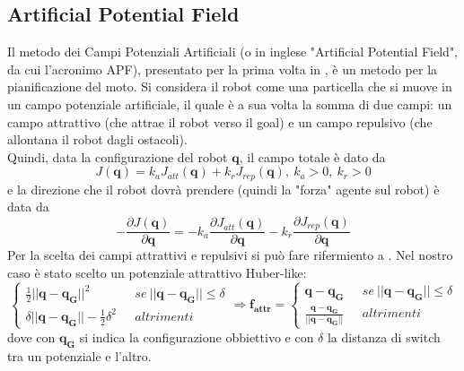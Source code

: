  \subsection{Artificial Potential Field} \label{APF}
Il metodo dei Campi Potenziali Artificiali (o in inglese "Artificial Potential Field", da cui l'acronimo APF), presentato per la prima volta in \cite{khatibAPF}, è un 
metodo per la pianificazione del moto. Si considera il robot come una particella che si muove in un campo potenziale artificiale, il quale è a sua volta la somma di due 
campi: un campo attrattivo (che attrae il robot verso il goal) e un campo repulsivo (che allontana il robot dagli ostacoli). \\
Quindi, data la configurazione del robot $\boldsymbol{q}$, il campo totale è dato da 
\begin{equation}
  J(\boldsymbol{q}) = k_a J_{att}(\boldsymbol{q}) + k_r J_{rep}(\boldsymbol{q}), \: k_a > 0, \: k_r > 0
\end{equation}
e la direzione che il robot dovrà prendere (quindi la "forza" agente sul robot) è data da 
\begin{equation}
  -\frac{\partial  J(\boldsymbol{q})}{\partial \boldsymbol{q}} = -  k_a \frac{\partial  J_{att}(\boldsymbol{q})}{\partial \boldsymbol{q}} - k_r \frac{\partial  J_{rep}(\boldsymbol{q})}{\partial \boldsymbol{q}}
\end{equation}
Per la scelta dei campi attrattivi e repulsivi si può fare rifermiento a \cite{libroRobotica}. Nel nostro caso è stato scelto un potenziale attrattivo Huber-like: 
\begin{equation}
  \begin{cases}
    \frac{1}{2} || \boldsymbol{q} - \boldsymbol{q_G}||^2 \: \: \:  \: \: \: & se \: || \boldsymbol{q} - \boldsymbol{q_G}|| \leq \delta \\
    \delta || \boldsymbol{q} - \boldsymbol{q_G}|| - \frac{1}{2}\delta^2 \: \: \: & altrimenti
  \end{cases} 
  \Rightarrow \boldsymbol{f_{attr}} = 
  \begin{cases}
   \boldsymbol{q} - \boldsymbol{q_G}\: \: \:  & se \: || \boldsymbol{q} - \boldsymbol{q_G}|| \leq \delta \\
    \frac{ \boldsymbol{q} - \boldsymbol{q_G}}{|| \boldsymbol{q} - \boldsymbol{q_G}||}  \: \: \: & altrimenti
  \end{cases} 
\end{equation}
dove con $  \boldsymbol{q_G} $ si indica la configurazione obbiettivo e con $ \delta  $ la distanza di switch tra un potenziale e l'altro. 

